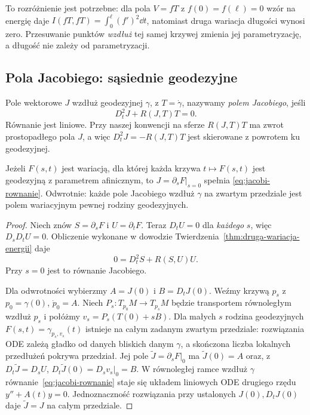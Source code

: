 To rozróżnienie jest potrzebne: dla pola
$V=fT$ z $f(0)=f(\ell)=0$ wzór na energię
daje $I(fT,fT)=\int_0^\ell(f')^2\dd t$,
natomiast druga wariacja długości wynosi
zero. Przesuwanie punktów \emph{wzdłuż} tej
samej krzywej zmienia jej parametryzację,
a długość nie zależy od parametryzacji.

\subsection*{Pola Jacobiego: sąsiednie geodezyjne}

\begin{definicja}
\label{def:pole-jacobiego}
Pole wektorowe $J$ wzdłuż geodezyjnej
$\gamma$, z $T=\dot\gamma$, nazywamy
\emph{polem Jacobiego}, jeśli
\begin{equation}\label{eq:jacobi-rownanie}
 D_t^2J+R(J,T)T=0.
\end{equation}
Równanie jest liniowe. Przy naszej konwencji
na sferze $R(J,T)T$ ma zwrot prostopadłego
pola $J$, a więc $D_t^2J=-R(J,T)T$
jest skierowane z powrotem ku geodezyjnej.
\end{definicja}

\begin{twierdzenie}
\label{thm:jacobi-wariacja-geodezyjnych}
Jeżeli $F(s,t)$ jest wariacją, dla której
każda krzywa $t\mapsto F(s,t)$ jest
geodezyjną z parametrem afinicznym, to
$J=\partial_sF|_{s=0}$ spełnia
\eqref{eq:jacobi-rownanie}. Odwrotnie:
każde pole Jacobiego wzdłuż $\gamma$ na
zwartym przedziale jest polem wariacyjnym
pewnej rodziny geodezyjnych.
\end{twierdzenie}
\begin{proof}
Niech znów $S=\partial_sF$ i $U=\partial_tF$.
Teraz $D_tU=0$ dla \emph{każdego} $s$,
więc $D_sD_tU=0$. Obliczenie wykonane
w dowodzie Twierdzenia~\ref{thm:druga-wariacja-energii}
daje
\[
 0=D_t^2S+R(S,U)U.
\]
Przy $s=0$ jest to równanie Jacobiego.

Dla odwrotności wybierzmy
$A=J(0)$ i $B=D_tJ(0)$.
Weźmy krzywą $p_s$ z $p_0=\gamma(0)$,
$\dot p_0=A$. Niech $P_s:T_{p_0}M\to T_{p_s}M$
będzie transportem równoległym wzdłuż $p_s$
i połóżmy $v_s=P_s(T(0)+sB)$.
Dla małych $s$ rodzina geodezyjnych
$F(s,t)=\gamma_{p_s,v_s}(t)$ istnieje na
całym zadanym zwartym przedziale: rozwiązania
ODE zależą gładko od danych bliskich danym
$\gamma$, a skończona liczba lokalnych
przedłużeń pokrywa przedział.
Jej pole $\widetilde J=\partial_sF|_0$
ma $\widetilde J(0)=A$ oraz, z
$D_t\widetilde J=D_sU$,
$D_t\widetilde J(0)=D_s v_s|_0=B$.
W równoległej ramce wzdłuż $\gamma$
równanie~\eqref{eq:jacobi-rownanie} staje się
układem liniowych ODE drugiego rzędu
$y''+A(t)y=0$. Jednoznaczność rozwiązania
przy ustalonych $J(0),D_tJ(0)$ daje
$\widetilde J=J$ na całym przedziale.
\end{proof}

